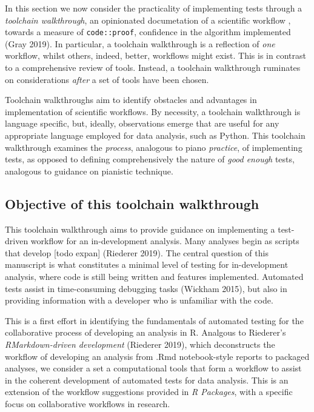 \documentclass[
]{article}
\begin{document}
In this section we now consider the practicality of implementing tests
through a \emph{toolchain walkthrough}, an opinionated documetation of a
scientific workflow , towards a measure of \texttt{code::proof},
confidence in the algorithm implemented (Gray 2019). In particular, a
toolchain walkthrough is a reflection of \emph{one} workflow, whilst
others, indeed, better, workflows might exist. This is in contrast to a
comprehensive review of tools. Instead, a toolchain walkthrough
ruminates on considerations \emph{after} a set of tools have been
chosen.

Toolchain walkthroughs aim to identify obstacles and advantages in
implementation of scientific workflows. By necessity, a toolchain
walkthrough is language specific, but, ideally, observations emerge that
are useful for any appropriate language employed for data analysis, such
as Python. This toolchain walkthrough examines the \emph{process},
analogous to piano \emph{practice}, of implementing tests, as opposed to
defining comprehensively the nature of \emph{good enough} tests,
analogous to guidance on pianistic technique.

\hypertarget{objective-of-this-toolchain-walkthrough}{%
\subsection{Objective of this toolchain
walkthrough}\label{objective-of-this-toolchain-walkthrough}}

This toolchain walkthrough aims to provide guidance on implementing a
test-driven workflow for an in-development analysis. Many analyses begin
as scripts that develop {[}todo expan{]} (Riederer 2019). The central
question of this manuscript is what constitutes a minimal level of
testing for in-development analysis, where code is still being written
and features implemented. Automated tests assist in time-consuming
debugging tasks (Wickham 2015), but also in providing information with a
developer who is unfamiliar with the code.

This is a first effort in identifying the fundamentals of automated
testing for the collaborative process of developing an analysis in R.
Analgous to Riederer's \emph{RMarkdown-driven development} (Riederer
2019), which deconstructs the workflow of developing an analysis from
.Rmd notebook-style reports to packaged analyses, we consider a set a
computational tools that form a workflow to assist in the coherent
development of automated tests for data analysis. This is an extension
of the workflow suggestions provided in \emph{R Packages}, with a
specific focus on collaborative workflows in research.
\end{document}
